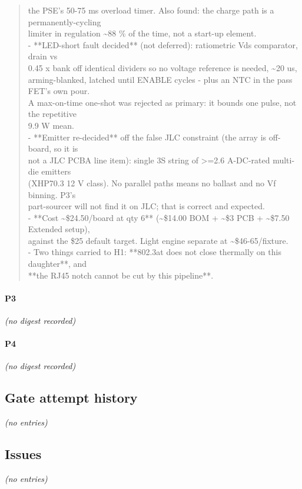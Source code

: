 \documentclass[11pt,a4paper]{article}
\begin{document}
\begin{quote}
  the PSE's 50-75 ms overload timer. Also found: the charge path is a permanently-cycling\\
  limiter in regulation \textasciitilde{}88 \% of the time, not a start-up element.\\
- {*}{*}LED-short fault decided{*}{*} (not deferred): ratiometric Vds comparator, drain vs\\
  0.45 x bank off identical dividers so no voltage reference is needed, \textasciitilde{}20 us,\\
  arming-blanked, latched until ENABLE cycles - plus an NTC in the pass FET's own pour.\\
  A max-on-time one-shot was rejected as primary: it bounds one pulse, not the repetitive\\
  9.9 W mean.\\
- {*}{*}Emitter re-decided{*}{*} off the false JLC constraint (the array is off-board, so it is\\
  not a JLC PCBA line item): single 3S string of \textgreater{}=2.6 A-DC-rated multi-die emitters\\
  (XHP70.3 12 V class). No parallel paths means no ballast and no Vf binning. P3's\\
  part-sourcer will not find it on JLC; that is correct and expected.\\
- {*}{*}Cost \textasciitilde{}\$24.50/board at qty 6{*}{*} (\textasciitilde{}\$14.00 BOM + \textasciitilde{}\$3 PCB + \textasciitilde{}\$7.50 Extended setup),\\
  against the \$25 default target. Light engine separate at \textasciitilde{}\$46-65/fixture.\\
- Two things carried to H1: {*}{*}802.3at does not close thermally on this daughter{*}{*}, and\\
  {*}{*}the RJ45 notch cannot be cut by this pipeline{*}{*}.
\end{quote}
\paragraph*{P3}
\emph{(no digest recorded)}
\paragraph*{P4}
\emph{(no digest recorded)}
\subsection*{Gate attempt history}
\emph{(no entries)}
\subsection*{Issues}
\emph{(no entries)}
\end{document}
